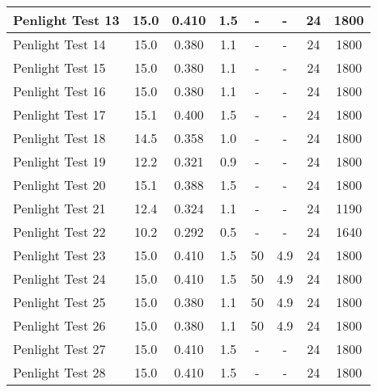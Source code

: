 \begin{table}[!ht]
\begin{center}
\begin{tabular}{|l|c|c|c|c|c|c|c|}
Penlight Test 13  &  15.0      &  0.410        &  1.5        &  -         &  -          &  24           &  1800         \\ \hline
Penlight Test 14  &  15.0      &  0.380        &  1.1        &  -         &  -          &  24           &  1800         \\ \hline
Penlight Test 15  &  15.0      &  0.380        &  1.1        &  -         &  -          &  24           &  1800         \\ \hline
Penlight Test 16  &  15.0      &  0.380        &  1.1        &  -         &  -          &  24           &  1800         \\ \hline
Penlight Test 17  &  15.1      &  0.400        &  1.5        &  -         &  -          &  24           &  1800         \\ \hline
Penlight Test 18  &  14.5      &  0.358        &  1.0        &  -         &  -          &  24           &  1800         \\ \hline
Penlight Test 19  &  12.2      &  0.321        &  0.9        &  -         &  -          &  24           &  1800         \\ \hline
Penlight Test 20  &  15.1      &  0.388        &  1.5        &  -         &  -          &  24           &  1800         \\ \hline
Penlight Test 21  &  12.4      &  0.324        &  1.1        &  -         &  -          &  24           &  1190         \\ \hline
Penlight Test 22  &  10.2      &  0.292        &  0.5        &  -         &  -          &  24           &  1640         \\ \hline
Penlight Test 23  &  15.0      &  0.410        &  1.5        &  50        &  4.9        &  24           &  1800         \\ \hline
Penlight Test 24  &  15.0      &  0.410        &  1.5        &  50        &  4.9        &  24           &  1800         \\ \hline
Penlight Test 25  &  15.0      &  0.380        &  1.1        &  50        &  4.9        &  24           &  1800         \\ \hline
Penlight Test 26  &  15.0      &  0.380        &  1.1        &  50        &  4.9        &  24           &  1800         \\ \hline
Penlight Test 27  &  15.0      &  0.410        &  1.5        &  -         &  -          &  24           &  1800         \\ \hline
Penlight Test 28  &  15.0      &  0.410        &  1.5        &  -         &  -          &  24           &  1800         \\ \hline

\end{tabular}
\end{center}
\end{table}

